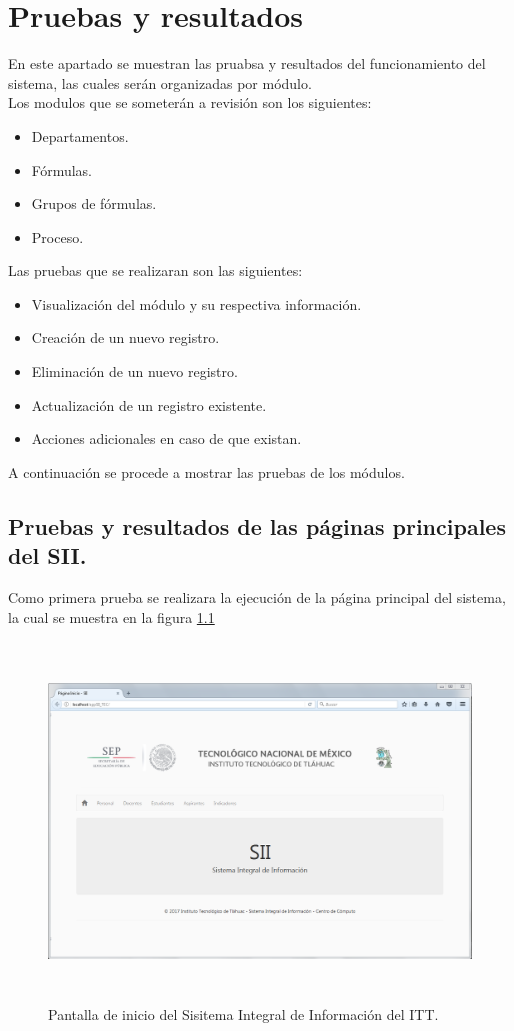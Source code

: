 \chapter{Pruebas y resultados}
	En este apartado se muestran las pruabsa y resultados del funcionamiento del sistema, las cuales ser\'an organizadas por m\'odulo.\\

	Los modulos que se someter\'an a revisi\'on son los siguientes:
	\begin{itemize}
		\item Departamentos.
		\item F\'ormulas.
		\item Grupos de f\'ormulas.
		\item Proceso.
	\end{itemize}

	Las pruebas que se realizaran son las siguientes:
	\begin{itemize}
		\item Visualizaci\'on del m\'odulo y su respectiva informaci\'on.
		\item Creaci\'on de un nuevo registro.
		\item Eliminaci\'on de un nuevo registro.
		\item Actualizaci\'on de un registro existente.
		\item Acciones adicionales en caso de que existan.
	\end{itemize}

	A continuaci\'on se procede a mostrar las pruebas de los m\'odulos. 

	\section{Pruebas y resultados de las p\'aginas principales del SII.}

		Como primera prueba se realizara la ejecuci\'on de la p\'agina principal del sistema, la cual se muestra en la figura \ref{fig_principal}

		\begin{figure}[H]
	        \centering
	        \includegraphics[width=16cm, height=9.5cm]{figuras/principal}
	        \caption{Pantalla de inicio del Sisitema Integral de Informaci\'on del ITT.}
	        \label{fig_principal}
	    \end{figure}

